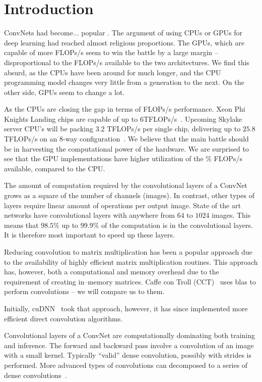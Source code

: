 \section{Introduction}

  ConvNets had become... popular .
  The argument of using CPUs or GPUs for deep learning had reached
  almost religious proportions.  The GPUs, which are capable of more
  FLOPs/s seem to win the battle by a large margin -- disproportional
  to the FLOPs/s available to the two architectures.  We find this
  absurd, as the CPUs have been around for much longer, and the CPU
  programming model changes very little from a generation to the next.
  On the other side, GPUs seem to change a lot.

  As the CPUs are closing the gap in terms of FLOPs/s performance.
  Xeon Phi Knights Landing chips are capable of up to
  6TFLOPs/s~\cite{}.  Upcoming Skylake server CPU's will be packing
  $3.2$ TFLOPs/s per single chip, delivering up to $25.8$ TFLOPs/s on
  an 8-way configuration~\cite{}.  We believe that the main battle
  should be in harvesting the computational power of the hardware.  We
  are surprised to see that the GPU implementations have higher
  utilization of the \% FLOPs/s available, compared to the CPU.

  The amount of computation required by the convolutional layers of a
  ConvNet grows as a square of the number of channels (images).  In
  contrast, other types of layers require linear amount of operations
  per output image.  State of the art networks have convolutional
  layers with anywhere from $64$ to $1024$ images.  This means that
  $98.5\%$ up to $99.9\%$ of the computation is in the convolutional
  layers.  It is therefore most important to speed up these layers.

  Reducing convolution to matrix multiplication has been a popular
  approach due to the availability of highly efficient matrix
  multiplication routines.  This approach has, however, both a
  computational and memory overhead due to the requirement of creating
  in--memory matrices.  Caffe con Troll (CCT)~\cite{hadjis2015shallow}
  uses blas to perform convolutions -- we will compare us to them.

  Initially, cuDNN~\cite{chetlur2014cudnn} took that approach,
  however, it has since implemented more efficient direct convolution
  algorithms.

  Convolutional layers of a ConvNet are computationally dominating
  both training and inference.  The forward and backward pass involve
  a convolution of an image with a small kernel.  Typically ``valid''
  dense convolution, possibly with strides is performed.  More
  advanced types of convolutions can decomposed to a series of dense
  convolutions~\cite{szegedy2015going}.

